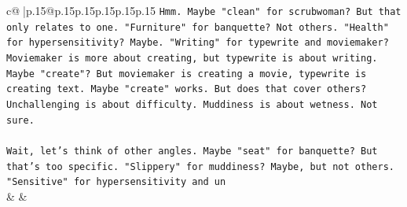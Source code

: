 \documentclass{article}
\begin{document}
{\begin{supertabular}{c@{$\;$}|p{.15\linewidth}@{}p{.15\linewidth}p{.15\linewidth}p{.15\linewidth}p{.15\linewidth}p{.15\linewidth}}
{{{\texttt{Hmm. Maybe "clean" for scrubwoman? But that only relates to one. "Furniture" for banquette? Not others. "Health" for hypersensitivity? Maybe. "Writing" for typewrite and moviemaker? Moviemaker is more about creating, but typewrite is about writing. Maybe "create"? But moviemaker is creating a movie, typewrite is creating text. Maybe "create" works. But does that cover others? Unchallenging is about difficulty. Muddiness is about wetness. Not sure.} \\
\\ 
\texttt{Wait, let's think of other angles. Maybe "seat" for banquette? But that's too specific. "Slippery" for muddiness? Maybe, but not others. "Sensitive" for hypersensitivity and un} \\
            }
        }
    }
    & & \\ \\


\end{supertabular}}
\end{document}
